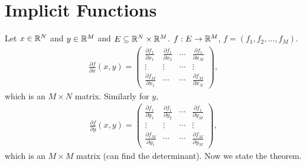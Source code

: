 \documentclass{report}
\begin{document}
\section{Implicit Functions}
Let $x \in \RR^N$ and $y \in \RR^M$ and $E \subseteq \RR^N \times \RR^M$. $f: E \to \RR^M$, $f = (f_1, f_2, \ldots, f_M)$.
\begin{align*}
    \frac{\partial f}{\partial x}(x, y) = \begin{pmatrix} \frac{\partial f_1}{\partial x_1} & \frac{\partial f_1}{\partial x_2} & \cdots & \frac{\partial f_1}{\partial x_M} \\ \vdots & \vdots &\cdots &\vdots \\ \frac{\partial f_M}{\partial x_1} & \cdots & \cdots & \frac{\partial f_M}{\partial x_N}\end{pmatrix},
\end{align*}
which is an $M \times N$ matrix. Similarly for $y$, 
\begin{align*}
    \frac{\partial f}{\partial y}(x, y) = \begin{pmatrix} \frac{\partial f_1}{\partial y_1} & \frac{\partial f_1}{\partial y_2} & \cdots & \frac{\partial f_1}{\partial y_M} \\ \vdots & \vdots & \cdots &\vdots \\ \frac{\partial f_M}{\partial y_1} & \cdots & \cdots & \frac{\partial f_M}{\partial y_M}\end{pmatrix},
\end{align*}
which is an $M \times M$ matrix (can find the determinant). Now we state the theorem.
\end{document}
